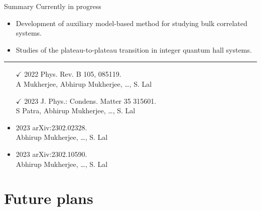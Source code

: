 \documentclass[12pt,aspectratio=169]{beamer}
\begin{document}
\begin{frame}{Summary}
\alert{Currently in progress}\\
\begin{itemize}
	\item Development of auxiliary model-based method for studying bulk correlated systems.\\[10pt]
	\item Studies of the plateau-to-plateau transition in integer quantum hall systems.
\end{itemize}

\vspace*{\fill}
\hrule

\vspace*{\fill}
\begin{minipage}{0.55\textwidth}
\begin{itemize}
	\item[$\checkmark$] 2022 \alert{Phys. Rev. B} 105, 085119.\\ A Mukherjee, \alert{Abhirup Mukherjee}, \ldots, S. Lal\\[10pt]
	\item[$\checkmark$] 2023 \alert{J. Phys.: Condens. Matter} 35 315601.\\ S Patra, \alert{Abhirup Mukherjee}, \ldots, S. Lal
\end{itemize}
\end{minipage}
\begin{minipage}{0.44\textwidth}
\begin{itemize}
	\item 2023 \alert{arXiv:2302.02328}.\\ \alert{Abhirup Mukherjee}, \ldots, S. Lal\\[10pt]
	\item 2023 \alert{arXiv:2302.10590}.\\ \alert{Abhirup Mukherjee}, \ldots, S. Lal
\end{itemize}
\end{minipage}

\end{frame}

\section{Future plans}
\subsection{~}
\end{document}
